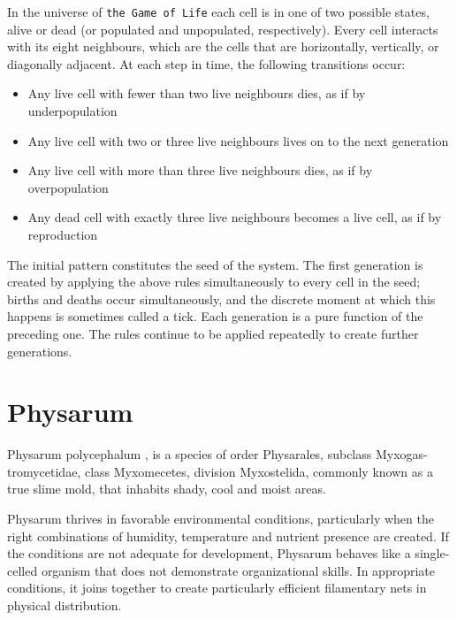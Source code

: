 \par
In the universe of \texttt{the Game of Life} each cell is in one of two possible states, alive or dead (or populated and unpopulated, respectively). Every cell interacts with its eight neighbours, which are the cells that are horizontally, vertically, or diagonally adjacent. At each step in time, the following transitions occur:
\begin{itemize}
\item Any live cell with fewer than two live neighbours dies, as if by underpopulation
\item Any live cell with two or three live neighbours lives on to the next generation
\item Any live cell with more than three live neighbours dies, as if by overpopulation
\item Any dead cell with exactly three live neighbours becomes a live cell, as if by reproduction
\end{itemize}
\par
The initial pattern constitutes the seed of the system. The first generation is created by applying the above rules simultaneously to every cell in the seed; births and deaths occur simultaneously, and the discrete moment at which this happens is sometimes called a tick. Each generation is a pure function of the preceding one. The rules continue to be applied repeatedly to create further generations. 

\section{Physarum}

Physarum polycephalum \cite{sun2017physarum}, \cite{mayne2016biology} is a species of order Physarales, subclass Myxogas-tromycetidae, class Myxomecetes, division Myxostelida, commonly known as a true slime mold, that inhabits shady, cool and moist areas. 
\par
Physarum thrives in favorable environmental conditions, particularly when the right combinations of humidity, temperature and nutrient presence are created. If the conditions are not adequate for development, Physarum behaves like a single-celled organism that does not demonstrate organizational skills. In appropriate conditions, it joins together to create particularly efficient filamentary nets in physical distribution.
